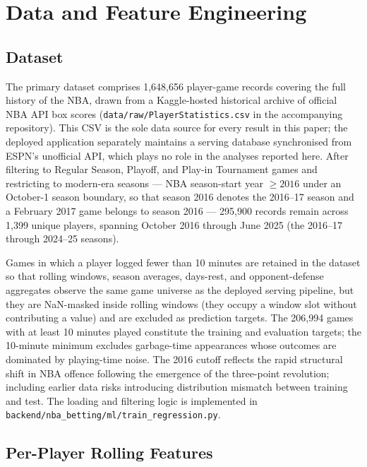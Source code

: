 \documentclass[12pt, letterpaper]{article}
\begin{document}
\section{Data and Feature Engineering}
\label{sec:data}

\subsection{Dataset}

The primary dataset comprises 1,648,656 player-game records covering the
full history of the NBA, drawn from a Kaggle-hosted historical archive of
official NBA API box scores
(\texttt{data/raw/PlayerStatistics.csv} in the accompanying repository).
This CSV is the sole data source for every result in this paper; the
deployed application separately maintains a serving database synchronised
from ESPN's unofficial API, which plays no role in the analyses reported
here.
After filtering to Regular Season, Playoff, and Play-in Tournament games
and restricting to modern-era seasons --- NBA season-start year
$\geq 2016$ under an October-1 season boundary, so that season 2016 denotes
the 2016--17 season and a February 2017 game belongs to season 2016 ---
295,900 records remain across 1,399 unique players, spanning October 2016
through June 2025 (the 2016--17 through 2024--25 seasons).

Games in which a player logged fewer than 10 minutes are retained in the
dataset so that rolling windows, season averages, days-rest, and
opponent-defense aggregates observe the same game universe as the deployed
serving pipeline, but they are NaN-masked inside rolling windows (they
occupy a window slot without contributing a value) and are excluded as
prediction targets.
The 206,994 games with at least 10 minutes played constitute the training
and evaluation targets; the 10-minute minimum excludes garbage-time
appearances whose outcomes are dominated by playing-time noise.
The 2016 cutoff reflects the rapid structural shift in NBA offence
following the emergence of the three-point revolution; including earlier
data risks introducing distribution mismatch between training and test.
The loading and filtering logic is implemented in
\texttt{backend/nba\_betting/ml/train\_regression.py}.

\subsection{Per-Player Rolling Features}
\end{document}
